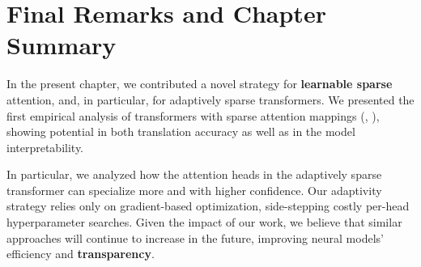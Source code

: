 \section{Final Remarks and Chapter Summary}

\noindent In the present chapter, we contributed a novel strategy for
\textbf{learnable sparse} attention, and, in particular, for adaptively
sparse transformers. We presented the first empirical analysis of
transformers with sparse attention mappings (\ie, \entmaxtext),
showing potential in both translation accuracy as well as in the model
interpretability.

In particular, we analyzed how the attention heads in the adaptively
sparse transformer can specialize more and with higher confidence.
Our adaptivity strategy relies only on gradient-based optimization,
side-stepping costly per-head hyperparameter searches. Given the
impact of our work, we believe that similar approaches will continue
to increase in the future, improving neural
models' efficiency and \textbf{transparency}.

\cleardoublepage

\singlespacing